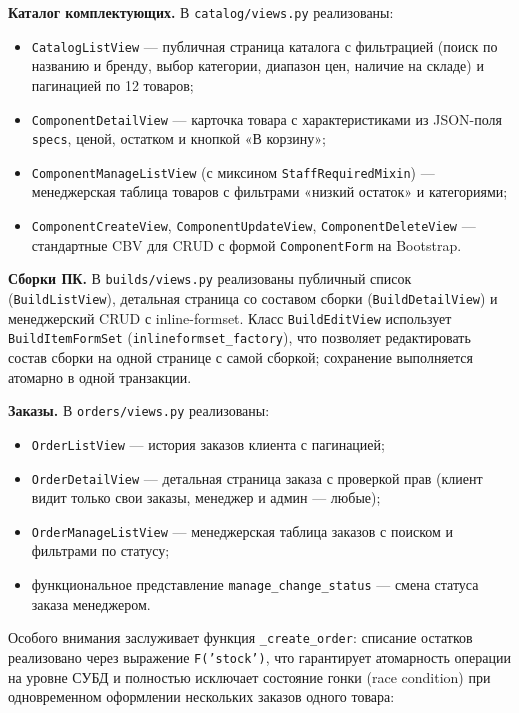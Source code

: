 \textbf{Каталог комплектующих.} В \texttt{catalog/views.py} реализованы:
\begin{itemize}
    \item \texttt{CatalogListView} --- публичная страница каталога с фильтрацией (поиск по названию и бренду, выбор категории, диапазон цен, наличие на складе) и пагинацией по 12 товаров;
    \item \texttt{ComponentDetailView} --- карточка товара с характеристиками из JSON-поля \texttt{specs}, ценой, остатком и кнопкой «В корзину»;
    \item \texttt{ComponentManageListView} (с миксином \texttt{StaffRequiredMixin}) --- менеджерская таблица товаров с фильтрами «низкий остаток» и категориями;
    \item \texttt{ComponentCreateView}, \texttt{ComponentUpdateView}, \texttt{ComponentDeleteView} --- стандартные CBV для CRUD с формой \texttt{ComponentForm} на Bootstrap.
\end{itemize}

\textbf{Сборки ПК.} В \texttt{builds/views.py} реализованы публичный список (\texttt{BuildListView}), детальная страница со составом сборки (\texttt{BuildDetailView}) и менеджерский CRUD с inline-formset. Класс \texttt{BuildEditView} использует \texttt{BuildItemFormSet} (\texttt{inlineformset\_factory}), что позволяет редактировать состав сборки на одной странице с самой сборкой; сохранение выполняется атомарно в одной транзакции.

\textbf{Заказы.} В \texttt{orders/views.py} реализованы:
\begin{itemize}
    \item \texttt{OrderListView} --- история заказов клиента с пагинацией;
    \item \texttt{OrderDetailView} --- детальная страница заказа с проверкой прав (клиент видит только свои заказы, менеджер и админ --- любые);
    \item \texttt{OrderManageListView} --- менеджерская таблица заказов с поиском и фильтрами по статусу;
    \item функциональное представление \texttt{manage\_change\_status} --- смена статуса заказа менеджером.
\end{itemize}

Особого внимания заслуживает функция \texttt{\_create\_order}: списание остатков реализовано через выражение \texttt{F('stock')}, что гарантирует атомарность операции на уровне СУБД и полностью исключает состояние гонки (race condition) при одновременном оформлении нескольких заказов одного товара:

